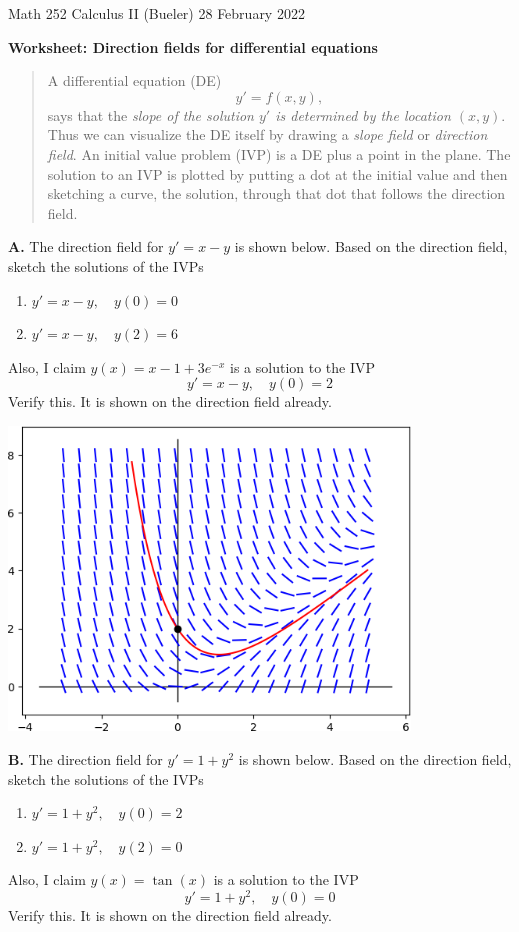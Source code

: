 \documentclass[11pt]{amsart}
\newcommand{\prob}[1]{\bigskip\noindent\textbf{#1.}\quad }
\begin{document}
\scriptsize \noindent Math 252 Calculus II (Bueler) \hfill 28 February 2022 \quad {}
\normalsize\medskip

\Large\centerline{\textbf{Worksheet: Direction fields for differential equations}}
\medskip
\normalsize

\thispagestyle{empty}
\begin{quote}
A differential equation (DE)
    $$y' = f(x,y),$$
says that the \emph{slope of the solution $y'$ is determined by the location $(x,y)$}.  Thus we can visualize the DE itself by drawing a \emph{slope field} or \emph{direction field}.  An initial value problem (IVP) is a DE plus a point in the plane.  The solution to an IVP is plotted by putting a dot at the initial value and then sketching a curve, the solution, through that dot that follows the direction field.
\end{quote}
\bigskip

\prob{A}  The direction field for $y' = x - y$ is shown below.  Based on the direction field, sketch the solutions of the IVPs
\renewcommand{\labelenumi}{(\roman{enumi})\,\,}
\begin{enumerate}
\item $y'=x-y, \quad y(0)=0$
\item $y'=x-y, \quad y(2)=6$
\end{enumerate}
Also, I claim $y(x) = x - 1 + 3 e^{-x}$ is a solution to the IVP
    $$y'=x-y, \quad y(0)=2$$
Verify this.  It is shown on the direction field already.
\bigskip

\begin{center}
\includegraphics[width=0.8\textwidth]{figs/probAfield.png}
\end{center}
\vfill

\clearpage\newpage
\prob{B}  The direction field for $y' = 1+y^2$ is shown below.  Based on the direction field, sketch the solutions of the IVPs
\renewcommand{\labelenumi}{(\roman{enumi})\,\,}
\begin{enumerate}
\item $y'= 1+y^2, \quad y(0)=2$
\item $y'= 1+y^2, \quad y(2)=0$
\end{enumerate}
Also, I claim $y(x) = \tan(x)$ is a solution to the IVP
    $$y' = 1+y^2, \quad y(0)=0$$
Verify this.  It is shown on the direction field already.
\bigskip
\end{document}
